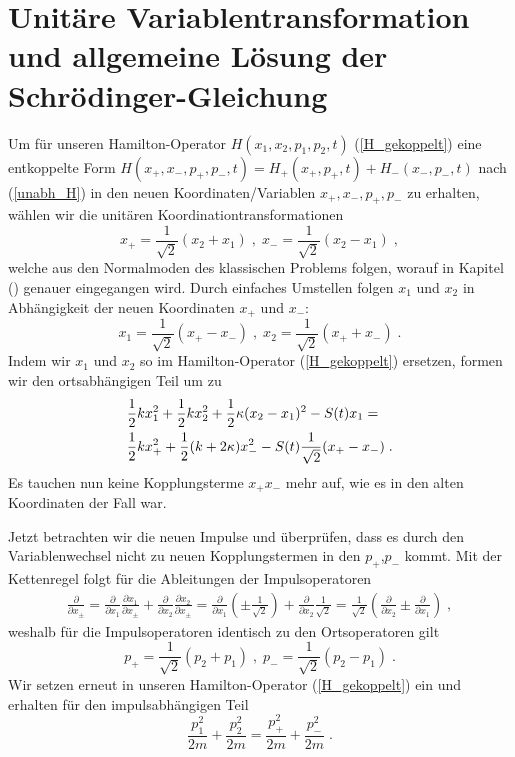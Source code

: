 \section{Unitäre Variablentransformation und allgemeine Lösung der Schrödinger-Gleichung}
  Um für unseren Hamilton-Operator $H(x_1,x_2,p_1,p_2,t)$ (\ref{H_gekoppelt}) eine entkoppelte Form $H(x_+,x_-,p_+,p_-,t)=H_+(x_+,p_+,t)+H_-(x_-,p_-,t)$ nach (\ref{unabh_H}) in den neuen Koordinaten/Variablen $x_+,x_-,p_+,p_-$ zu erhalten, wählen wir die unitären Koordinationtransformationen \cite{arxiv}
  \begin{equation}
    x_+ = \frac{1}{\sqrt{2}}(x_2+x_1) \;,\; x_-=\frac{1}{\sqrt{2}}(x_2-x_1) \;,
    \label{koord_trafo_x}
  \end{equation}
  welche aus den Normalmoden des klassischen Problems folgen, worauf in Kapitel () genauer eingegangen wird.
  Durch einfaches Umstellen folgen $x_1$ und $x_2$ in Abhängigkeit der neuen Koordinaten $x_+$ und $x_-$:
  \begin{equation}
    x_1=\frac{1}{\sqrt{2}}(x_+-x_-) \;,\; x_2=\frac{1}{\sqrt{2}}(x_++x_-) \; .
  \end{equation}
  Indem wir $x_1$ und $x_2$ so im Hamilton-Operator (\ref{H_gekoppelt}) ersetzen, formen wir den ortsabhängigen Teil um zu
  \begin{align}
    &\frac{1}{2}kx_1^2+\frac{1}{2}kx_2^2+\frac{1}{2}\kappa(x_2-x_1)^2-S(t)x_1= \notag\\
    &\frac{1}{2}kx_+^2+\frac{1}{2}(k+2\kappa)x_-^2-S(t)\frac{1}{\sqrt{2}}(x_+-x_-) \; .
  \end{align}
  Es tauchen nun keine Kopplungsterme $x_+x_-$ mehr auf, wie es in den alten Koordinaten der Fall war.

  Jetzt betrachten wir die neuen Impulse und überprüfen, dass es durch den Variablenwechsel nicht zu neuen Kopplungstermen in den $p_+$,$p_-$ kommt.
  Mit der Kettenregel folgt für die Ableitungen der Impulsoperatoren
  \begin{align}
    \frac{\partial}{\partial x_{\pm}} = \frac{\partial}{\partial x_1}\frac{\partial x_1}{\partial x_{\pm}} + \frac{\partial}{\partial x_2}\frac{\partial x_2}{\partial x_{\pm}}
    =\frac{\partial}{\partial x_1}\left(\pm\frac{1}{\sqrt{2}}\right)
    + \frac{\partial}{\partial x_2}\frac{1}{\sqrt{2}}
    = \frac{1}{\sqrt{2}}\left(\frac{\partial}{\partial x_2}\pm\frac{\partial}{\partial  x_1}\right) \;,
  \end{align}
  weshalb für die Impulsoperatoren identisch zu den Ortsoperatoren gilt
  \begin{equation}
    p_+ = \frac{1}{\sqrt{2}}(p_2+p_1) \;,\; p_-=\frac{1}{\sqrt{2}}(p_2-p_1) \; .
    \label{koord_trafo_p}
  \end{equation}
  Wir setzen erneut in unseren Hamilton-Operator (\ref{H_gekoppelt}) ein und erhalten für den impulsabhängigen Teil
  \begin{equation}
    \frac{p_1^2}{2m} + \frac{p_2^2}{2m} = \frac{p_+^2}{2m} + \frac{p_-^2}{2m} \; .
    \label{koord_trafo_p^2}
  \end{equation}

